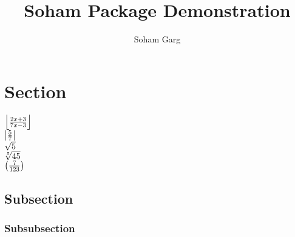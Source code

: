 \documentclass[11pt]{scrartcl}
\title{Soham Package Demonstration}
\author{Soham Garg}
\begin{document}
\maketitle

\section{Section}
$\left\lfloor {\frac{2x+3}{7x-3}}\right\rfloor$\\
$\left\vert {\frac{5}{7}}\right\vert$\\
$\sqrt{5}$\\
$\sqrt[5]{45}$\\
$\left(\frac{7}{123} \right)$
\subsection{Subsection}
\subsubsection{Subsubsection}
\end{document}
